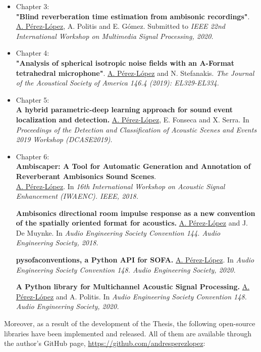 \begin{itemize}

	\item Chapter 3:\\
	\textbf{"Blind reverberation time estimation from ambisonic recordings"}.
	\underline{A. P\'erez-L\'opez}, A. Politis and E. G\'omez.
	Submitted to \textit{IEEE 22nd International Workshop on Multimedia Signal Processing, 2020.}
	
	\item Chapter 4:\\
	\textbf{"Analysis of spherical isotropic noise fields with an A-Format tetrahedral microphone"}.
	\underline{A. P\'erez-L\'opez} and N. Stefanakis.
	\textit{The Journal of the Acoustical Society of America 146.4 (2019): EL329-EL334.}

	\item Chapter 5:\\
	\textbf{A hybrid parametric-deep learning approach for sound event localization and detection.}
	\underline{A. P\'erez-L\'opez}, E. Fonseca and X. Serra.
	In \textit{Proceedings of the Detection and Classification of Acoustic Scenes and Events 2019 Workshop (DCASE2019)}.
	
	\item Chapter 6:\\
	\textbf{Ambiscaper: A Tool for Automatic Generation and Annotation of Reverberant Ambisonics Sound Scenes}.\\
	\underline{A. P\'erez-L\'opez}.
	In \textit{16th International Workshop on Acoustic Signal Enhancement (IWAENC). IEEE, 2018.}
	
	\textbf{Ambisonics directional room impulse response as a new convention of the spatially oriented format for acoustics.}
	\underline{A. P\'erez-L\'opez} and J. De Muynke.
	In \textit{Audio Engineering Society Convention 144. Audio Engineering Society, 2018.}
	
	\textbf{pysofaconventions, a Python API for SOFA.}
	\underline{A. P\'erez-L\'opez}.
	In \textit{Audio Engineering Society Convention 148. Audio Engineering Society, 2020.}
	
	\textbf{A Python library for Multichannel Acoustic Signal Processing.}
	\underline{A. P\'erez-L\'opez} and A. Politis.
	In \textit{Audio Engineering Society Convention 148. Audio Engineering Society, 2020.}
	
\end{itemize}


Moreover, as a result of the development of the Thesis, the following open-source libraries have been implemented and released. All of them are available through the author's GitHub page, \url{https://github.com/andresperezlopez}: 


